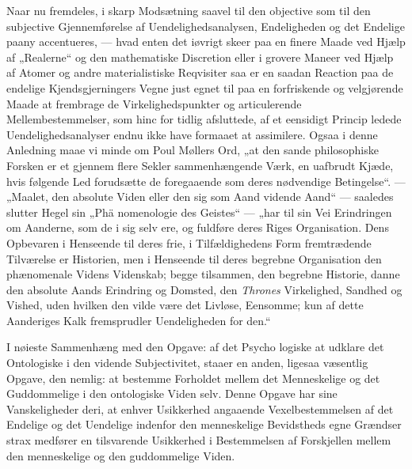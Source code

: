 \documentclass[11pt]{book}
\newcommand{\opage}[1]{\marginnote{\footnotesize\textit{[#1]}}}
\begin{document}
Naar nu fremdeles, i skarp Modsætning saavel til den objective som til
den subjective Gjennemførelse af Uendelighedsanalysen, Endeligheden og
det Endelige paany accentueres, --- hvad enten det iøvrigt skeer paa en
finere Maade ved Hjælp af „Realerne“ og den mathematiske Discretion
eller i grovere Maneer ved Hjælp af Atomer og andre materialistiske
Reqvisiter saa er en saadan Reaction paa de endelige Kjendsgjerningers
Vegne just egnet til paa en forfriskende og velgjørende Maade at
frembrage de Virkelighedspunkter og articulerende Mellembestemmelser,
som hinc for tidlig afsluttede, af et eensidigt Princip ledede
Uendelighedsanalyser endnu ikke have formaaet at assimilere. Ogsaa i
denne Anledning maae vi minde om Poul Møllers Ord, „at den sande
philosophiske Forsken er et gjennem flere Sekler sammenhængende Værk, en
uafbrudt Kjæde, hvis følgende Led forudsætte de foregaaende som deres
nødvendige Betingelse“. --- „Maalet, den absolute Viden eller den sig
som Aand vidende Aand“ --- saaledes slutter Hegel sin
„Phä\-%
nomenologie des Geistes“ --- „har til sin Vei Erindringen om Aanderne,
som de i sig selv ere, og fuldføre deres Riges Organisation. Dens
Opbevaren i Henseende til deres frie, i Tilfældighedens Form
fremtrædende Tilværelse er Historien, men i Henseende til deres begrebne
Organisation den phænomenale Videns Videnskab; begge tilsammen, den
begrebne Historie, danne den absolute Aands Erindring og Domsted, den
\emph{Thrones} Virkelighed, Sandhed og Vished, uden hvilken den vilde
være det Livløse, Eensomme; kun af dette Aanderiges Kalk fremsprudler
Uendeligheden for den.“

I nøieste Sammenhæng med den Opgave: af det Psycho\-%
\opage{233} \setcounter{footnote}{0}%
logiske at udklare det Ontologiske i den vidende Subjectivitet, staaer
en anden, ligesaa væsentlig Opgave, den nemlig: at bestemme Forholdet
mellem det Menneskelige og det Guddommelige i den ontologiske Viden
selv. Denne Opgave har sine Vanskeligheder deri, at enhver Usikkerhed
angaaende Vexelbestemmelsen af det Endelige og det Uendelige indenfor
den menneskelige Bevidstheds egne Grændser strax medfører en tilsvarende
Usikkerhed i Bestemmelsen af Forskjellen mellem den menneskelige og den
guddommelige Viden.
\end{document}
